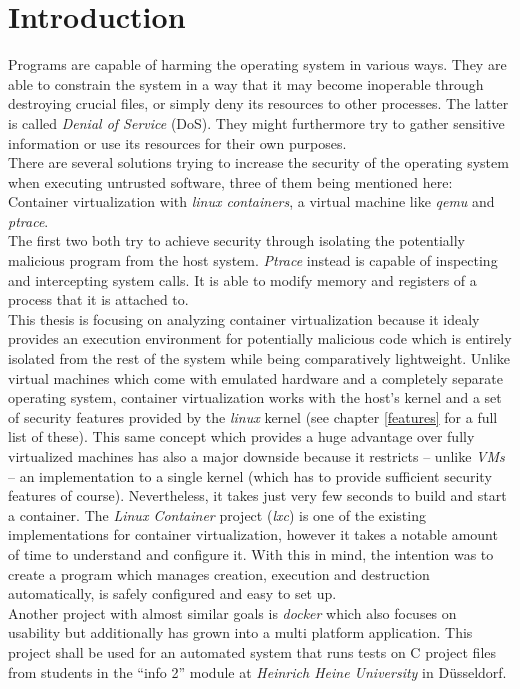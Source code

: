 \chapter{Introduction}

Programs are capable of harming the operating system in various ways. They are able to constrain the system in a way that
it may become inoperable through destroying crucial files, or simply deny its resources to other processes.
The latter is called \textit{Denial of Service} (DoS).
They might furthermore try to gather sensitive information or use its resources for their own purposes.\\
There are several solutions trying to increase the security of the operating system when executing untrusted software,
three of them being mentioned here:\\
Container virtualization with \textit{linux containers}\cite{lxc}, a virtual machine like \textit{qemu}\cite{qemu} and \textit{ptrace}\cite{ptrace}.\\
The first two both try to achieve security through isolating the potentially malicious program from the host system.
\textit{Ptrace} instead is capable of inspecting and intercepting system calls. It is able to modify memory and registers of a process that it is attached to.\\
This thesis is focusing on analyzing container virtualization because it idealy provides an execution environment for
potentially malicious code which is entirely isolated from the rest of the system while being comparatively
lightweight. Unlike virtual machines which come with emulated hardware and a completely separate operating
system, container virtualization works with the host's kernel and a set of security features provided by the
\textit{linux} kernel (see chapter \ref{features} for a full list of these).
This same concept which provides a huge advantage over fully virtualized machines has also a major downside
because it restricts -- unlike  \textit{VMs} -- an implementation to a single kernel (which has to provide sufficient
security features of course). Nevertheless, it takes just very few seconds to build and start a container.
The \textit{Linux Container} project (\textit{lxc}) is one of the existing implementations for container virtualization,
however it takes a notable amount of time to understand and configure it. With this in mind, the intention was to create a program
which manages creation, execution and destruction automatically, is safely configured and easy to set up.\\
Another project with almost similar goals is \textit{docker}\cite{docker} which also focuses on usability but
additionally has grown into a multi platform application.
This project shall be used for an automated system that runs tests on C project files from students in the ``info 2'' module
at \textit{Heinrich Heine University} in Düsseldorf.